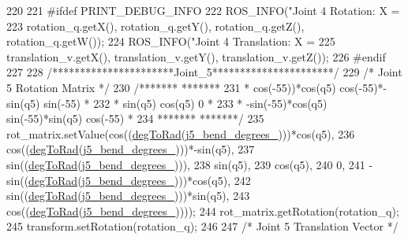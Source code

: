\begin{DoxyCode}
{{{{{{{{{{220 
221 \textcolor{preprocessor}{#ifdef PRINT\_DEBUG\_INFO}
222     ROS\_INFO(\textcolor{stringliteral}{"Joint 4 Rotation: X = %
223              rotation\_q.getX(), rotation\_q.getY(), rotation\_q.getZ(), rotation\_q.getW());
224     ROS\_INFO(\textcolor{stringliteral}{"Joint 4 Translation: X = %
225              translation\_v.getX(), translation\_v.getY(), translation\_v.getZ());
226 \textcolor{preprocessor}{#endif}
227 
228     \textcolor{comment}{/**********************Joint\_5**********************/}
229     \textcolor{comment}{/* Joint 5 Rotation Matrix */}
230     \textcolor{comment}{/*******                                         *******}
231 \textcolor{comment}{     * cos(-55))*cos(q5)    cos(-55)*-sin(q5)     sin(-55) *}
232 \textcolor{comment}{     * sin(q5)                   cos(q5)             0     *}
233 \textcolor{comment}{     * -sin(-55)*cos(q5)    sin(-55)*sin(q5)      cos(-55) *}
234 \textcolor{comment}{     *******                                        *******/}
235     rot\_matrix.setValue(cos((\hyperlink{classjaco_1_1JacoKinematics_a340eda126d97aa3700cc5dc8be89aa39}{degToRad}(\hyperlink{classjaco_1_1JacoKinematics_ad309e89a6e5c60e0f614629c5f1b4c79}{j5\_bend\_degrees\_})))*cos(q5),
236                         cos((\hyperlink{classjaco_1_1JacoKinematics_a340eda126d97aa3700cc5dc8be89aa39}{degToRad}(\hyperlink{classjaco_1_1JacoKinematics_ad309e89a6e5c60e0f614629c5f1b4c79}{j5\_bend\_degrees\_})))*-sin(q5),
237                         sin((\hyperlink{classjaco_1_1JacoKinematics_a340eda126d97aa3700cc5dc8be89aa39}{degToRad}(\hyperlink{classjaco_1_1JacoKinematics_ad309e89a6e5c60e0f614629c5f1b4c79}{j5\_bend\_degrees\_}))),
238                         sin(q5),
239                         cos(q5),
240                         0,
241                         -sin((\hyperlink{classjaco_1_1JacoKinematics_a340eda126d97aa3700cc5dc8be89aa39}{degToRad}(\hyperlink{classjaco_1_1JacoKinematics_ad309e89a6e5c60e0f614629c5f1b4c79}{j5\_bend\_degrees\_})))*cos(q5),
242                         sin((\hyperlink{classjaco_1_1JacoKinematics_a340eda126d97aa3700cc5dc8be89aa39}{degToRad}(\hyperlink{classjaco_1_1JacoKinematics_ad309e89a6e5c60e0f614629c5f1b4c79}{j5\_bend\_degrees\_})))*sin(q5),
243                         cos((\hyperlink{classjaco_1_1JacoKinematics_a340eda126d97aa3700cc5dc8be89aa39}{degToRad}(\hyperlink{classjaco_1_1JacoKinematics_ad309e89a6e5c60e0f614629c5f1b4c79}{j5\_bend\_degrees\_}))));
244     rot\_matrix.getRotation(rotation\_q);
245     transform.setRotation(rotation\_q);
246 
247     \textcolor{comment}{/* Joint 5 Translation Vector */}
}}}}}}}}}}}}
\end{DoxyCode}
